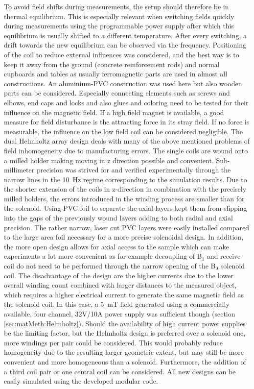             To avoid field shifts during measurements, the setup should therefore be in thermal equilibrium. This is especially relevant when switching fields quickly during measurements using the programmable power supply after which this equilibrium is usually shifted to a different temperature. After every switching, a drift towards the new equilibrium can be observed via the frequency.
            Positioning of the coil to reduce external influences was considered, and the best way is to keep it away from the ground (concrete reinforcement rods) and normal cupboards and tables as usually ferromagnetic parts are used in almost all constructions. An aluminium-PVC construction was used here but also wooden parts can be considered. Especially connecting elements such as screws and elbows, end caps and locks and also glues and coloring need to be tested for their influence on the magnetic field. If a high field magnet is available, a good measure for field disturbance is the attracting force in its stray field. If no force is measurable, the influence on the low field coil can be considered negligible.
            The dual Helmholtz array design deals with many of the above mentioned problems of field inhomogeneity due to manufacturing errors. The single coils are wound onto a milled holder making moving in z direction possible and convenient. Sub-millimeter precision was strived for and verified experimentally through the narrow lines in the \SI{10}{\hertz} regime corresponding to the simulation results. Due to the shorter extension of the coils in z-direction in combination with the precisely milled holders, the errors introduced in the winding process are smaller than for the solenoid. Using PVC foil to separate the axial layers kept them from slipping into the gaps of the previously wound layers adding to both radial and axial precision. The rather narrow, laser cut PVC layers were easily installed compared to the large area foil necessary for a more precise solenoidal design.
            In addition, the more open design allows for axial access to the sample which can make experiments a lot more convenient as for example decoupling of B$_1$ and receive coil do not need to be performed through the narrow opening of the B$_0$ solenoid coil. The disadvantage of the design are the higher currents due to the lower overall winding count combined with larger distances to the measured object, which requires a higher electrical current to generate the same magnetic field as the solenoid coil. In this case, a \SI{5}{\milli\tesla} field generated using a commercially available, four channel, 32V/10A power supply was sufficient though (section \ref{sec:matMeth:Helmholtz}). Should the availability of high current power supplies be the limiting factor, but the Helmholtz design is preferred over a solenoid one, more windings per pair could be considered. This would probably reduce homogeneity due to the resulting larger geometric extent, but may still be more convenient and more homogeneous than a solenoid. Furthermore, the addition of a third coil pair or one central coil can be considered. All new designs can be easily simulated using the developed modular code.
